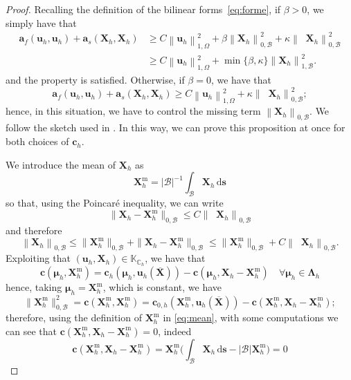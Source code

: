 \documentclass[oneside]{amsart} %
\newcommand{\numberset}{\mathbb}
\newcommand{\K}{\numberset{K}}
\newcommand{\C}{\numberset{C}}
\newcommand{\norm}[1]{\left\lVert#1\right\rVert}
\newcommand{\abs}[1]{\left\lvert#1\right\rvert}
\DeclareMathOperator{\grads}{\boldsymbol\nabla_s}
\newcommand\B{\mathcal B} %
\renewcommand\u{\mathbf{u}} %
\renewcommand\a{\mathbf{a}} %
\renewcommand\c{\mathbf{c}} %
\newcommand\s{\mathbf{s}} %
\newcommand\X{\mathbf{X}} %
\newcommand\Xbar{\overline{\X}} %
\newcommand\Xcirc{\X^{\mathrm{m}}_h}%
\newcommand\LL{{\boldsymbol{\Lambda}}} %
\newcommand\mmu{{\boldsymbol\mu}} %
\newcommand\ds{\mathrm{d}\s} %
\renewcommand\lg{\begin{color}{black}}
\newcommand\gl{\end{color}}
\begin{document}
	\begin{proof}
		Recalling the definition of the bilinear forms~\eqref{eq:forme}, if $\beta>0$, we simply have that
		\begin{equation}
			\begin{aligned}
				\a_f(\u_h,\u_h) + \a_s(\X_h,\X_h) &\ge C\norm{\u_h}_{1,\Omega}^2 + \beta \norm{\X_h}_{0,\B}^2 + \kappa \norm{\grads\X_h}_{0,\B}^2\\
				&\ge C\norm{\u_h}_{1,\Omega}^2 + \min\{\beta,\kappa\}\norm{\X_h}_{1,\B}^2.
			\end{aligned}
		\end{equation}
		and the property is satisfied. Otherwise, if $\beta=0$, we have that
		\begin{equation}\label{eq:beta_zero}
			\a_f(\u_h,\u_h) + \a_s(\X_h,\X_h) \ge C\norm{\u_h}_{1,\Omega}^2 + \kappa \norm{\grads\X_h}_{0,\B}^2;
		\end{equation}
		hence, in this situation, we have to control the missing term
		$\norm{\X_h}_{0,\B}$. We follow the sketch used in \cite{2021}. In this way,
		we can prove this proposition at once for both choices of $\c_h$.
		
		We introduce the mean of $\X_h$ as
		\begin{equation}\label{eq:mean}
			\Xcirc = \abs{\B}^{-1} \int_\B \X_h\,\ds 
		\end{equation}
		so that, using the Poincar\'{e} inequality, we can write
		\begin{equation}
			\|\X_h-\Xcirc\|_{0,\B} \leq C \norm{\grads\X_h}_{0,\B}
		\end{equation}
		and therefore
		\begin{equation} \label{eq:initial_bound}
			\norm{\X_h}_{0,\B} \le \|\Xcirc\|_{0,\B} + \|\X_h-\Xcirc\|_{0,\B} \le \|\Xcirc\|_{0,\B}+C\norm{\grads\X_h}_{0,\B}.
		\end{equation}
		Exploiting that $(\u_h,\X_h)\in\K_{\C_h}$, we have that
		\begin{equation}\label{eq:c_manip}
			\c(\mmu_h,\Xcirc) = \c_h(\mmu_h,\u_h(\Xbar)) - \c(\mmu_h,\X_h-\Xcirc)\quad\forall\mmu_h\in\LL_h
		\end{equation}
		hence, taking $\mmu_h=\Xcirc$, which is constant, we have 
		\begin{equation}
			\|\Xcirc\|_{0,\B}^2 = \c(\Xcirc,\Xcirc) = \c_{0,h}(\Xcirc,\u_h(\Xbar)) - \c(\Xcirc,\X_h-\Xcirc);
		\end{equation}
		therefore, using the definition of $\Xcirc$ in \eqref{eq:mean}, with some computations we can see that $\c(\Xcirc,\X_h-\Xcirc)=0$, indeed
		\begin{equation}\label{eq:computations}
			\c(\Xcirc,\X_h-\Xcirc) = \Xcirc \bigg( \int_\B \X_h\,\ds - \abs{\B}\Xcirc \bigg) = 0
		\end{equation}
		

\end{proof}
\end{document}
